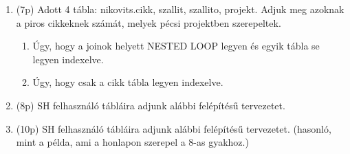 \documentclass[a4paper,11.5pt, table]{article}
\begin{document}
	\begin{enumerate}
		\item (7p) Adott 4 tábla: nikovits.cikk, szallit, szallito, projekt. Adjuk meg azoknak a piros cikkeknek számát, melyek pécsi projektben szerepeltek.
		\begin{enumerate}
			\item Úgy, hogy a joinok helyett NESTED LOOP legyen és egyik tábla se legyen indexelve.
			\item Úgy, hogy csak a cikk tábla legyen indexelve.
		\end{enumerate}
	
		\item (8p) SH felhasználó tábláira adjunk alábbi felépítésű tervezetet.
		
		\item (10p) SH felhasználó tábláira adjunk alábbi felépítésű tervezetet. (hasonló, mint a példa, ami a honlapon szerepel a 8-as gyakhoz.)
	\end{enumerate}
\end{document}
